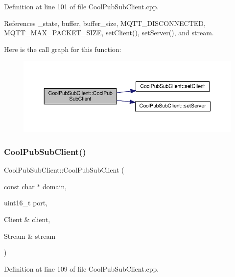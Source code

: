 Definition at line 101 of file Cool\+Pub\+Sub\+Client.\+cpp.



References \+\_\+state, buffer, buffer\+\_\+size, M\+Q\+T\+T\+\_\+\+D\+I\+S\+C\+O\+N\+N\+E\+C\+T\+ED, M\+Q\+T\+T\+\_\+\+M\+A\+X\+\_\+\+P\+A\+C\+K\+E\+T\+\_\+\+S\+I\+ZE, set\+Client(), set\+Server(), and stream.

Here is the call graph for this function\+:\nopagebreak
\begin{figure}[H]
\begin{center}
\leavevmode
\includegraphics[width=350pt]{d8/d4b/class_cool_pub_sub_client_a469eefe7429f0cbb6d7d443b52488411_cgraph}
\end{center}
\end{figure}
\mbox{\label{class_cool_pub_sub_client_a103e7286407babde84d63bb735c4e4b6}} 
\subsubsection{\texorpdfstring{Cool\+Pub\+Sub\+Client()}{CoolPubSubClient()}\hspace{0.1cm}{\footnotesize\ttfamily [12/14]}}
{\footnotesize\ttfamily Cool\+Pub\+Sub\+Client\+::\+Cool\+Pub\+Sub\+Client (\begin{DoxyParamCaption}\item[{const char $\ast$}]{domain,  }\item[{uint16\+\_\+t}]{port,  }\item[{Client \&}]{client,  }\item[{Stream \&}]{stream }\end{DoxyParamCaption})}



Definition at line 109 of file Cool\+Pub\+Sub\+Client.\+cpp.



